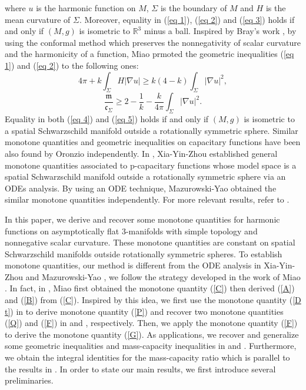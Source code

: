 \documentclass[12pt]{article}
\theoremstyle{definition}
\theoremstyle{plain}
\numberwithin{equation}{section}
\begin{document}
where $ u $ is the harmonic function on $ M $, $ \Sigma $ is the boundary of $ M $ and $ H $ is the mean curvature of $ \Sigma $. Moreover, equality in (\ref{eq 1}), (\ref{eq 2}) and (\ref{eq 3}) holds if and only if $ (M,g) $ is isometric to $ \mathbb{R}^{3} $ minus a ball. Inspired by Bray’s work \cite{Bray1}, by using the conformal method which preserves the nonnegativity of scalar curvature and the harmonicity of a function, Miao \cite{Miao} prmoted the geometric inequalities (\ref{eq 1}) and (\ref{eq 2}) to the following ones:
\begin{equation}\label{eq 4}
4\pi+k\int_{\Sigma}H|\nabla u|\geq k(4-k)\int_{\Sigma}|\nabla u|^{2},
\end{equation}
\begin{equation}\label{eq 5}
\frac{\mathfrak{m}}{\mathfrak{c}_{\Sigma}}\geq 2-\frac{1}{k}-\frac{k}{4\pi}\int_{\Sigma}|\nabla u|^{2}.
\end{equation}
Equality in both (\ref{eq 4}) and (\ref{eq 5}) holds if and only if $ (M,g) $ is isometric to a spatial Schwarzschild manifold outside a rotationally symmetric sphere.  Similar monotone quantities and geometric inequalities on capacitary functions have been also found by Oronzio \cite{Oronzio} independently. In \cite{Xia}, Xia-Yin-Zhou established general monotone quantities associated to p-capacitary functions whose model space is a spatial Schwarzschild manifold outside a rotationally symmetric sphere via an ODEs analysis. By using an ODE technique, Mazurowski-Yao \cite{Maz} obtained the similar monotone quantities independently. For more relevant results, refer to \cite{Fog1,Fog2,Mazz,Bray3,Hrisch1,Hrisch2,Mantou,Miao 0,Miao1}.

  In this paper, we derive and recover some monotone quantities for harmonic functions on asymptotically flat 3-manifolds with simple topology and nonnegative scalar curvature. These monotone quantities are constant
  on spatial Schwarzschild manifolds outside rotationally symmetric spheres. To establish monotone quantities, our method is different from the ODE analysis in  Xia-Yin-Zhou \cite{Xia} and Mazurowski-Yao \cite{Maz}, we follow the strategy developed in the work of Miao \cite{Miao}. In fact, in \cite{Miao}, Miao first obtained the monotone quantity (\ref{C}) then derived (\ref{A}) and (\ref{B}) from (\ref{C}). Inspired by this idea, we first use the monotone quantity (\ref{D t}) in \cite{Xia} to derive monotone quantity (\ref{P}) and recover two monotone quantities (\ref{Q}) and (\ref{F}) in \cite{Miao 0} and \cite{Xia}, respectively. Then, we apply the monotone quantity (\ref{F}) to derive the monotone quantity (\ref{G}). As applications, we recover and generalize some geometric inequalities and mass-capacity inequalities in \cite{Miao} and \cite{Oronzio}.  Furthermore, we obtain the integral identities for the mass-capacity ratio which is parallel to the results in \cite{Miao}.    In order to state our main results, we first introduce several preliminaries.
\end{document}
